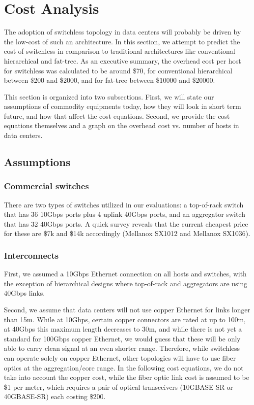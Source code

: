 \vspace{-0.1in}
\section{Cost Analysis}
\label{sec:cost_model}

The adoption of switchless topology in data centers will probably be driven by the low-cost of such an architecture. In this section, we attempt to predict the cost of switchless in comparison to traditional architectures like conventional hierarchical and fat-tree. As an executive summary, the overhead cost per host for switchless was calculated to be around \$70, for conventional hierarchical between \$200 and \$2000, and for fat-tree between \$10000 and \$20000.

This section is organized into two subsections. First, we will state our assumptions of commodity equipments today, how they will look in short term future, and how that affect the cost equations. Second, we provide the cost equations themselves and a graph on the overhead cost vs. number of hosts in data centers.
\vspace{-0.1in}
\subsection{Assumptions}


\subsubsection{Commercial switches}

There are two types of switches utilized in our evaluations: a top-of-rack switch that has 36 10Gbps ports plus 4 uplink 40Gbps ports, and an aggregator switch that has 32 40Gbps ports. A quick survey reveals that the current cheapest price for these are \$7k and \$14k accordingly (Mellanox SX1012 and Mellanox SX1036).

\subsubsection{Interconnects}
First, we assumed a 10Gbps Ethernet connection on all hosts and switches, with the exception of hierarchical designs where top-of-rack and aggregators are using 40Gbps links.

Second, we assume that data centers will not use copper Ethernet for links longer than 15m. While at 10Gbps, certain copper connectors are rated at up to 100m, at 40Gbps this maximum length decreases to 30m, and while there is not yet a standard for 100Gbps copper Ethernet, we would guess that these will be only able to carry clean signal at an even shorter range. Therefore, while switchless can operate solely on copper Ethernet, other topologies will have to use fiber optics at the aggregation/core range. In the following cost equations, we do not take into account the copper cost, while the fiber optic link cost is assumed to be \$1 per meter, which requires a pair of optical transceivers (10GBASE-SR or 40GBASE-SR) each costing \$200.

